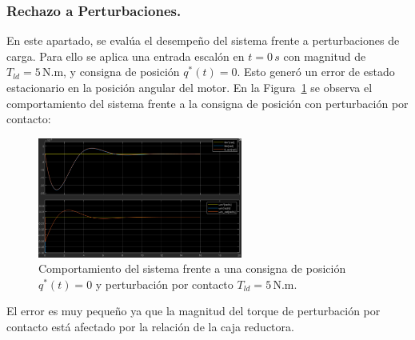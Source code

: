 \documentclass{article}
\begin{document}
\newpage
\subsubsection{Rechazo a Perturbaciones.}
\label{sec:rechazo_perturbaciones}

En este apartado, se evalúa el desempeño del sistema frente a perturbaciones de carga. Para ello se aplica una entrada
escalón en \( t = 0\,s\) con magnitud de \(T_{ld} = 5\,\text{N.m}\), y consigna de posición \(q^*(t) = 0\). Esto generó un error de estado
estacionario en la posición angular del motor. En la Figura~\ref{fig:RechazoPerturbacionesSimulacionCompleta} se observa el comportamiento del sistema frente a la consigna de posición con perturbación por contacto:

\begin{figure}[H]
    \centering
    \includegraphics[width=0.6\textwidth]{Imagenes/RechazoPerturbacionesSimulacionCompleta.png}
    \caption{Comportamiento del sistema frente a una consigna de posición \(q^*(t) = 0\) y perturbación por contacto \(T_{ld} = 5\,\text{N.m}\).}
    \label{fig:RechazoPerturbacionesSimulacionCompleta}
\end{figure}

El error es muy pequeño ya que la magnitud del torque de perturbación por contacto está afectado por la relación de la caja reductora.
\end{document}
